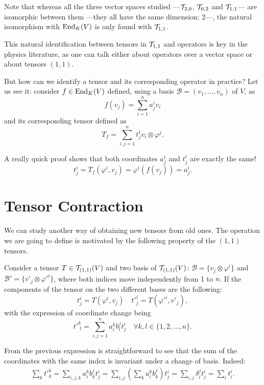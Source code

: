 Note that whereas all the three vector spaces studied ---${\mathcal T}_{2,0}$, ${\mathcal T}_{0,2}$ and ${\mathcal T}_{1,1}$--- are isomorphic between them ---they all have the same dimension: 2---, the natural isomorphism with $\operatorname{End}_K(V)$ is only found with ${\mathcal T}_{1,1}$.

\begin{remark}
	This natural identification between tensors in ${\mathcal T}_{1,1}$ and operators is key in the physics literature, as one can talk either about operators over a vector space or about tensors $(1,1)$.

	But how can we identify a tensor and its corresponding operator in practice? Let us see it: consider $f \in \operatorname{End}_K(V)$ defined, using a basis $\mathcal{B} = (v_1, \dots, v_n)$ of $V$, as
	\[
		f(v_j) = \sum_{i=1}^n a^i_j v_i
	\]
	and its corresponding tensor defined as
	\[
		T_f = \sum_{i,j=1}^n t^i_j v_i \otimes \varphi^j.
	\]

	A really quick proof shows that both coordinates $a^i_j$ and $t^i_j$ are exactly the same!
	\[
		t^i_j = T_f(\varphi^i, v_j) = \varphi^i(f(v_j)) = a^i_j.
	\]
\end{remark}

\section{Tensor Contraction}

We can study another way of obtaining new tensors from old ones. The operation we are going to define is motivated by the following property of the $(1,1)$ tensors.

Consider a tensor $T \in {\mathcal T}_{(1,1)}(V)$ and two basis of ${\mathcal T}_{(1,1)}(V)$: $\mathcal{B} = \{v_j \otimes \varphi^i\}$ and $\mathcal{B}' = \{v'_j \otimes \varphi'^i\}$, where both indices move independently from 1 to $n$. If the components of the tensor on the two different bases are the following:
\[
	t^i_j = T(\varphi^i, v_j) \quad t'^i_j = T(\varphi'^i, v'_j),
\]
with the expression of coordinate change being
\[
	t'^k_{\phantom{'}l} = \sum_{i,j = 1}^n a^k_i b_l^j  t^i_j \quad \forall k,l \in \{1,2,\dots,n\}.
\]

From the previous expression is straightforward to see that \cite[p. 198]{romero86} the sum of the coordinates with the same index is invariant under a change of basis. Indeed:
\begin{align*}
	\sum_k t'^k_k = \sum_{i,j,k} a^k_i b_k^j  t^i_j = \sum_{i,j} \left( \sum_k a^k_i b_k^j \right) t^i_j = \sum_{i,j} \delta_i^j t^i_j = \sum_i t^i_i.
\end{align*}


